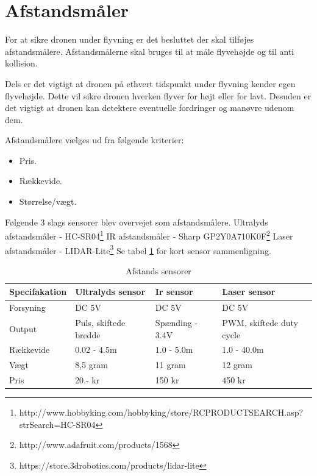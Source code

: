 \section{Afstandsmåler}

For at sikre dronen under flyvning er det besluttet der skal tilføjes afstandsmålere. Afstandsmålerne skal bruges til at måle flyvehøjde og til anti kollision.

Dels er det vigtigt at dronen på ethvert tidspunkt under flyvning kender egen flyvehøjde. Dette vil sikre dronen hverken flyver for højt eller for lavt. Desuden er det vigtigt at dronen kan detektere eventuelle fordringer og manøvre udenom dem.

Afstandsmålere vælges ud fra følgende kriterier:  
\begin{itemize}
	\item Pris.
	\item Rækkevide. 
	\item Størrelse/vægt. 
\end{itemize}

\vspace{0.5cm}

Følgende 3 slags sensorer blev overvejet som afstandsmålere. 
\newline Ultralyds afstandsmåler - HC-SR04\footnote{http://www.hobbyking.com/hobbyking/store/RC\textunderscore PRODUCT\textunderscore SEARCH.asp?strSearch=HC-SR04}  
\newline IR afstandsmåler - Sharp GP2Y0A710K0F\footnote{http://www.adafruit.com/products/1568}  \newline Laser afstandsmåler - LIDAR-Lite\footnote{https://store.3drobotics.com/products/lidar-lite}  \newline Se tabel \ref{tab:Afstands_sensorer} for kort sensor sammenligning.

\begin{table}[H]
	\centering
		\begin{tabular}{|p{2.8cm}|p{3.4 cm}|p{3.4 cm}|p{3.4 cm}|} 
		\hline
			\textbf{Specifakation} 	& \textbf{Ultralyds sensor} 	& \textbf{Ir sensor} 		& \textbf{Laser sensor} \\ \hline
			 Forsyning 				& DC 5V 						& DC 5V 					& DC 5V \\ \hline			 
			 Output 				& Puls, \newline skiftede bredde 		& Spænding \newline 1.4 - 3.4V 		& PWM, \newline skiftede duty cycle\\ \hline
			 Rækkevide 					& 0.02 - 4.5m 					& 1.0 - 5.0m 				& 1.0 - 40.0m \\ \hline
			 Vægt 					& 8,5 gram 						& 11 gram 					& 12 gram \\ \hline
		 	 Pris 					& 20.- kr 						& 150 kr 					& 450 kr \\ \hline			 
		\end{tabular}
	\caption{Afstands sensorer}
	\label{tab:Afstands_sensorer}
\end{table}

